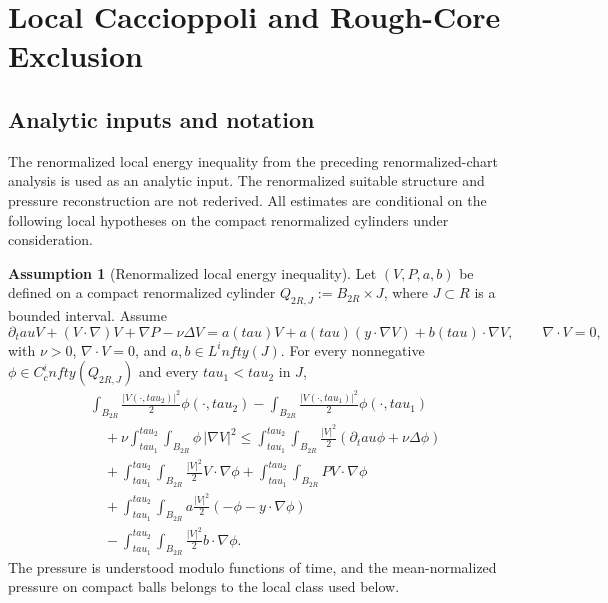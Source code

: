 \documentclass[11pt]{amsart}
\def\mathbb#1{#1}%
\def\tau{tau}%
\def\infty{infty}%
\theoremstyle{plain}
\theoremstyle{definition}
\newtheorem{assumption}[theorem]{Assumption}
\theoremstyle{remark}
\begin{document}
\clearpage
\section{Local Caccioppoli and Rough-Core Exclusion}\label{sec:rough-core-exclusion}
\subsection{Analytic inputs and notation}

The renormalized local energy inequality from the preceding renormalized-chart
analysis is used as an analytic input.  The renormalized suitable structure and
pressure reconstruction are not rederived.  All estimates are conditional on
the following local hypotheses on the compact renormalized cylinders under
consideration.

\begin{assumption}[Renormalized local energy inequality]\label{paper4:ass:lei}
Let $(V,P,a,b)$ be defined on a compact renormalized cylinder
$Q_{2R,J}:=B_{2R}\times J$, where $J\subset\mathbb R$ is a bounded interval.
Assume
\begin{equation}\label{paper4:eq:renorm-ns}
\partial_\tau V+(V\cdot\nabla)V+\nabla P-\nu\Delta V
= a(\tau)V+a(\tau)(y\cdot\nabla V)+b(\tau)\cdot\nabla V,
\qquad
\nabla\cdot V=0,
\end{equation}
with $\nu>0$, $\nabla\cdot V=0$, and $a,b\in L^\infty(J)$. For every
nonnegative $\phi\in C_c^\infty(Q_{2R,J})$ and every $\tau_1<\tau_2$ in $J$,
\begin{equation}\label{paper4:eq:local-energy}
\begin{aligned}
&\int_{B_{2R}}\frac{|V(\cdot,\tau_2)|^2}{2}\phi(\cdot,\tau_2)
-\int_{B_{2R}}\frac{|V(\cdot,\tau_1)|^2}{2}\phi(\cdot,\tau_1)
\\
&\quad+\nu\int_{\tau_1}^{\tau_2}\!\int_{B_{2R}}\phi\,|\nabla V|^2
\le
\int_{\tau_1}^{\tau_2}\!\int_{B_{2R}}\frac{|V|^2}{2}(\partial_\tau\phi+\nu\Delta\phi)
\\
&\quad+\int_{\tau_1}^{\tau_2}\!\int_{B_{2R}}\frac{|V|^2}{2}V\cdot\nabla\phi
+\int_{\tau_1}^{\tau_2}\!\int_{B_{2R}}PV\cdot\nabla\phi
\\
&\quad+\int_{\tau_1}^{\tau_2}\!\int_{B_{2R}}
a\frac{|V|^2}{2}(-\phi-y\cdot\nabla\phi)
\\
&\quad-\int_{\tau_1}^{\tau_2}\!\int_{B_{2R}}\frac{|V|^2}{2}b\cdot\nabla\phi.
\end{aligned}
\end{equation}
The pressure is understood modulo functions of time, and the mean-normalized
pressure on compact balls belongs to the local class used below.
\end{assumption}
\end{document}
